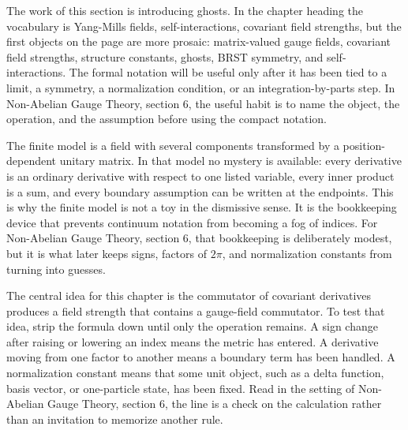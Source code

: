 











The work of this section is introducing ghosts.  In the chapter heading the vocabulary is Yang-Mills fields, self-interactions, covariant field strengths, but the first objects on the page are more prosaic: matrix-valued gauge fields, covariant field strengths, structure constants, ghosts, BRST symmetry, and self-interactions.  The formal notation will be useful only after it has been tied to a limit, a symmetry, a normalization condition, or an integration-by-parts step.  In Non-Abelian Gauge Theory, section 6, the useful habit is to name the object, the operation, and the assumption before using the compact notation.

The finite model is a field with several components transformed by a position-dependent unitary matrix.  In that model no mystery is available: every derivative is an ordinary derivative with respect to one listed variable, every inner product is a sum, and every boundary assumption can be written at the endpoints.  This is why the finite model is not a toy in the dismissive sense.  It is the bookkeeping device that prevents continuum notation from becoming a fog of indices.  For Non-Abelian Gauge Theory, section 6, that bookkeeping is deliberately modest, but it is what later keeps signs, factors of \(2\pi\), and normalization constants from turning into guesses.

The central idea for this chapter is the commutator of covariant derivatives produces a field strength that contains a gauge-field commutator.  To test that idea, strip the formula down until only the operation remains.  A sign change after raising or lowering an index means the metric has entered.  A derivative moving from one factor to another means a boundary term has been handled.  A normalization constant means that some unit object, such as a delta function, basis vector, or one-particle state, has been fixed.  Read in the setting of Non-Abelian Gauge Theory, section 6, the line is a check on the calculation rather than an invitation to memorize another rule.

